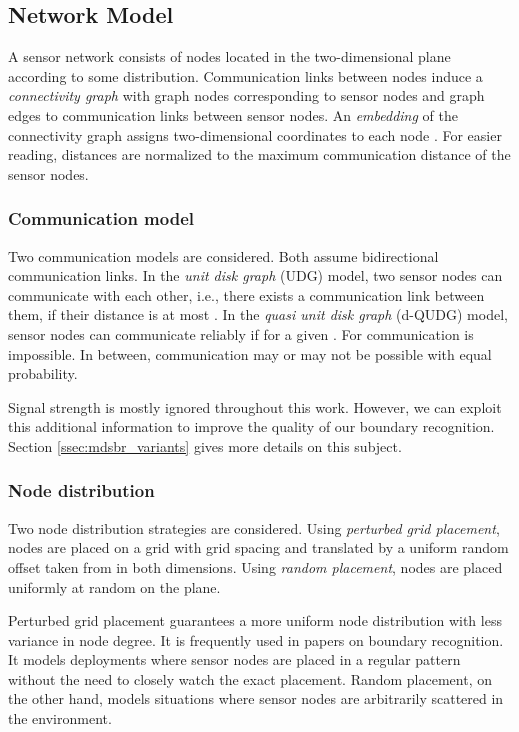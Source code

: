 \documentclass{llncs}
\begin{document}
\subsection{Network Model}\label{sec:network_model}
A sensor network consists of nodes located in the two-dimensional plane according to some distribution.
Communication links between nodes induce a \emph{connectivity graph}  with graph nodes  corresponding to sensor nodes and graph edges  to communication links between sensor nodes.
An \emph{embedding}  of the connectivity graph  assigns two-dimensional coordinates  to each node .
For easier reading, distances are normalized to the maximum communication distance of the sensor nodes.

\subsubsection{Communication model}
Two communication models are considered.
Both assume bidirectional communication links.
In the \emph{unit disk graph} (UDG) model, two sensor nodes  can communicate with each other, i.e., there exists a communication link between them, if their distance  is at most .
In the \emph{quasi unit disk graph} (d-QUDG) model, sensor nodes  can communicate reliably if  for a given .
For  communication is impossible.
In between, communication may or may not be possible with equal probability.

Signal strength is mostly ignored throughout this work.
However, we can exploit this additional information to improve the quality of our boundary recognition.
Section \ref{ssec:mdsbr_variants} gives more details on this subject.

\subsubsection{Node distribution}
Two node distribution strategies are considered.
Using \emph{perturbed grid placement}, nodes are placed on a grid with grid spacing  and translated by a uniform random offset taken from  in both dimensions.
Using \emph{random placement}, nodes are placed uniformly at random on the plane.

Perturbed grid placement guarantees a more uniform node distribution with less variance in node degree.
It is frequently used in papers on boundary recognition.
It models deployments where sensor nodes are placed in a regular pattern without the need to closely watch the exact placement.
Random placement, on the other hand, models situations where sensor nodes are arbitrarily scattered in the environment.
\end{document}
